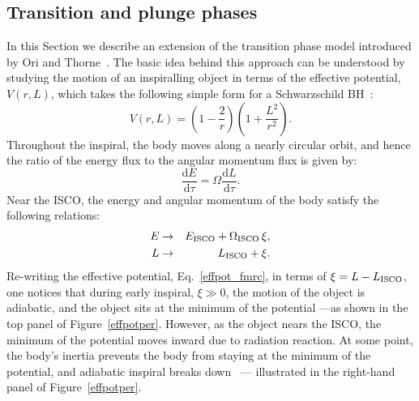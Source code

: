 \subsection{Transition and plunge phases}
\label{trans}
In this Section we describe an extension of the transition phase model introduced by Ori and Thorne~\cite{amos}. The basic idea behind this approach can be understood by studying the motion of an inspiralling object in terms of the effective potential, \(V(r, L)\), which takes the following simple form for  a Schwarzschild BH~\cite{mtw}:
\begin{equation}
V(r, L) = \left(1-\frac{2}{r} \right)\left(1+ \frac{L^2}{r^2}\right).
\label{effpot_fmrc}
\end{equation} 
\noindent Throughout the inspiral, the body moves along a nearly circular orbit, and hence the ratio of the energy flux to the angular momentum flux is given by:
\begin{equation}
 \frac{{\mathrm{d}}E}{{\mathrm{d}}\tau} = \Omega  \frac{{\mathrm{d}}L}{{\mathrm{d}}\tau}.
 \label{radII}
 \end{equation}
Near the ISCO, the energy and angular momentum of the body satisfy the following relations:
\begin{eqnarray}
\label{ener_emri}
E & \rightarrow & E_{\rm{ISCO}} + \Omega_{\rm{ISCO}}\, \xi,\\
\label{ang_emri}
L  & \rightarrow & L_{\rm{ISCO}}+  \xi.
\end{eqnarray}
\noindent Re-writing the effective potential, Eq.~\eqref{effpot_fmrc}, in terms of \(\xi = L-L_{\rm{ISCO}}\), one notices that during early inspiral, \(\xi \gg0\), the motion of the object is adiabatic, and the object sits at the minimum of the potential ---as shown in the top panel of Figure~\ref{effpotper}. However, as the object nears the ISCO, the minimum of the potential moves inward due to radiation reaction. At some point, the body's inertia prevents the body from staying at the minimum of the potential, and adiabatic inspiral breaks down~\cite{amos} --- illustrated in the right-hand panel of Figure~\ref{effpotper}.


